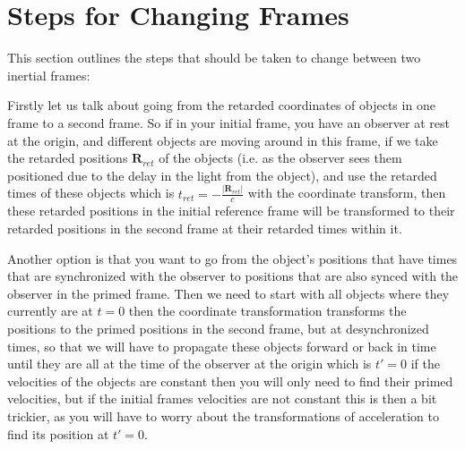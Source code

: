 

\section{Steps for Changing Frames}

This section outlines the steps that should be taken to change between two inertial frames: \newline

Firstly let us talk about going from the retarded coordinates of objects in one frame to a second frame.
So if in your initial frame, you have an observer at rest at the origin, and different objects are moving around in this frame, if we take the retarded positions $\mathbf{R}_{ret}$ of the objects (i.e.
as the observer sees them positioned due to the delay in the light from the object), and use the retarded times of these objects which is ${t}_{ret}=- \frac{|\mathbf{R}_{ret}|}{c}$ with the coordinate transform, then these retarded positions in the initial reference frame will be transformed to their retarded positions in the second frame at their retarded times within it.
\newline

Another option is that you want to go from the object's positions that have times that are synchronized with the observer to positions that are also synced with the observer in the primed frame.
Then we need to start with all objects where they currently are at $t=0$ then the coordinate transformation transforms the positions to the primed positions in the second frame, but at desynchronized times, so that we will have to propagate these objects forward or back in time until they are all at the time of the observer at the origin which is $t{'}=0$ if the velocities of the objects are constant then you will only need to find their primed velocities, but if the initial frames velocities are not constant this is then a bit trickier, as you will have to worry about the transformations of acceleration to find its position at $t{'}=0$.

